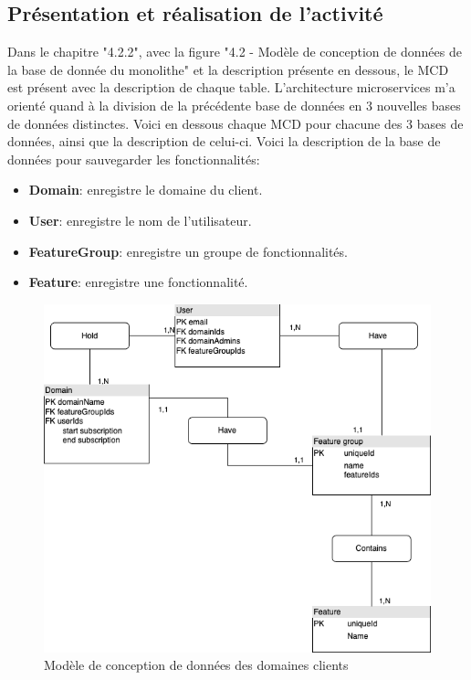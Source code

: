 \documentclass[a4paper, 11pt]{report}
\begin{document}
\subsection{Présentation et réalisation de l'activité}
  Dans le chapitre "4.2.2", avec la figure "4.2 - Modèle de conception de données de la base de donnée du monolithe" et la description présente en dessous, le MCD est présent avec la description de chaque table.
  L'architecture microservices m'a orienté quand à la division de la précédente base de données en 3 nouvelles bases de données distinctes.
  \newline
  Voici en dessous chaque MCD pour chacune des 3 bases de données, ainsi que la description de celui-ci.
  Voici la description de la base de données pour sauvegarder les fonctionnalités:
  \begin{itemize}
    \item \textbf{Domain}: enregistre le domaine du client.
    \item \textbf{User}: enregistre le nom de l'utilisateur.
    \item \textbf{FeatureGroup}: enregistre un groupe de fonctionnalités.
    \item \textbf{Feature}: enregistre une fonctionnalité.
  \end{itemize}
  \begin{figure}[H]
      \centering
      \includegraphics[scale=0.40,center]{schemas/features-mcd-ralph2.png}
      \caption{Modèle de conception de données des domaines clients}
  \end{figure}
\end{document}

